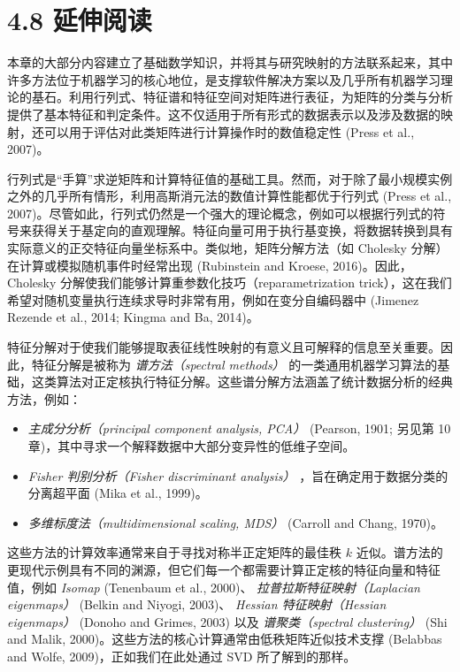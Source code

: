 \section*{4.8 延伸阅读}
\label{sec:4.8}

本章的大部分内容建立了基础数学知识，并将其与研究映射的方法联系起来，其中许多方法位于机器学习的核心地位，是支撑软件解决方案以及几乎所有机器学习理论的基石。利用行列式、特征谱和特征空间对矩阵进行表征，为矩阵的分类与分析提供了基本特征和判定条件。这不仅适用于所有形式的数据表示以及涉及数据的映射，还可以用于评估对此类矩阵进行计算操作时的数值稳定性 (Press et al., 2007)。

行列式是“手算”求逆矩阵和计算特征值的基础工具。然而，对于除了最小规模实例之外的几乎所有情形，利用高斯消元法的数值计算性能都优于行列式 (Press et al., 2007)。尽管如此，行列式仍然是一个强大的理论概念，例如可以根据行列式的符号来获得关于基定向的直观理解。特征向量可用于执行基变换，将数据转换到具有实际意义的正交特征向量坐标系中。类似地，矩阵分解方法（如 Cholesky 分解）在计算或模拟随机事件时经常出现 (Rubinstein and Kroese, 2016)。因此，Cholesky 分解使我们能够计算重参数化技巧（reparametrization trick），这在我们希望对随机变量执行连续求导时非常有用，例如在变分自编码器中 (Jimenez Rezende et al., 2014; Kingma and Ba, 2014)。

特征分解对于使我们能够提取表征线性映射的有意义且可解释的信息至关重要。因此，特征分解是被称为 \emph{谱方法（spectral methods）} 的一类通用机器学习算法的基础，这类算法对正定核执行特征分解。这些谱分解方法涵盖了统计数据分析的经典方法，例如：

\begin{itemize}
\item \emph{主成分分析（principal component analysis, PCA）} (Pearson, 1901; 另见第 10 章)，其中寻求一个解释数据中大部分变异性的低维子空间。
\item \emph{Fisher 判别分析（Fisher discriminant analysis）} ，旨在确定用于数据分类的分离超平面 (Mika et al., 1999)。
\item \emph{多维标度法（multidimensional scaling, MDS）} (Carroll and Chang, 1970)。
\end{itemize}

这些方法的计算效率通常来自于寻找对称半正定矩阵的最佳秩 $ k $ 近似。谱方法的更现代示例具有不同的渊源，但它们每一个都需要计算正定核的特征向量和特征值，例如 \emph{Isomap} (Tenenbaum et al., 2000)、 \emph{拉普拉斯特征映射（Laplacian eigenmaps）} (Belkin and Niyogi, 2003)、 \emph{Hessian 特征映射（Hessian eigenmaps）} (Donoho and Grimes, 2003) 以及 \emph{谱聚类（spectral clustering）} (Shi and Malik, 2000)。这些方法的核心计算通常由低秩矩阵近似技术支撑 (Belabbas and Wolfe, 2009)，正如我们在此处通过 SVD 所了解到的那样。

